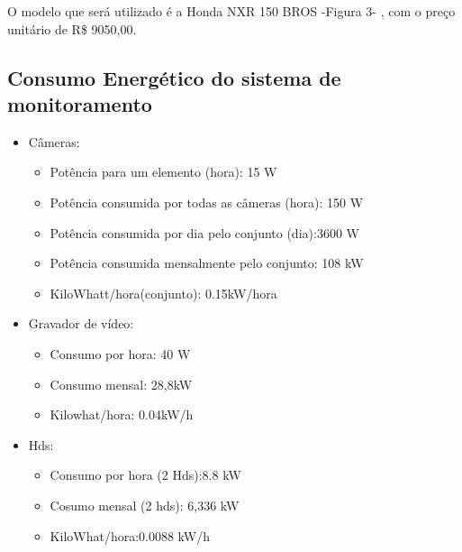 O modelo que será utilizado é a Honda NXR 150 BROS -Figura 3- , com o preço unitário  de R\$ 9050,00.

\subsection{Consumo Energético do sistema de monitoramento}

\begin{itemize}
	\item Câmeras: 
	\begin{itemize}
	\item Potência para um elemento (hora): 15 W
 	\item Potência consumida por todas as câmeras (hora): 150 W
	\item Potência consumida por dia pelo conjunto (dia):3600 W
	\item Potência consumida mensalmente pelo conjunto: 108 kW
	\item KiloWhatt/hora(conjunto): 0.15kW/hora	
	\end{itemize}

	\item Gravador de vídeo:
	\begin{itemize}
	\item Consumo por hora: 40 W
	\item Consumo mensal: 28,8kW
	\item Kilowhat/hora: 0.04kW/h
	\end{itemize}		
	
	\item Hds:
	\begin{itemize}
	\item Consumo por hora (2 Hds):8.8 kW
	\item Cosumo mensal (2 hds): 6,336 kW
	\item KiloWhat/hora:0.0088 kW/h
	\end{itemize}

\end{itemize}

